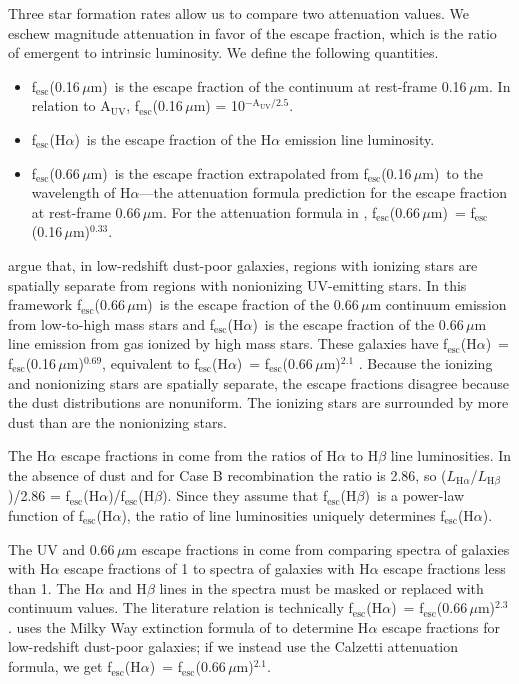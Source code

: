 \documentclass[referee]{aa}
\newcommand{\alephuv}{f$_{\mathrm{esc}}$(0.16$\,\mu$m)}
\newcommand{\alephha}{f$_{\mathrm{esc}}$(H$\alpha$)}
\newcommand{\alephuvha}{f$_{\mathrm{esc}}$(0.66$\,\mu$m)}
\newcommand{\alephhb}{f$_{\mathrm{esc}}$(H$\beta$)}
\begin{document}
Three star formation rates allow us to compare two attenuation values.
We eschew magnitude attenuation in favor of the escape fraction, which
is the ratio of emergent to intrinsic luminosity.  We define the following
quantities.
\begin{itemize}
\item \alephuv~is the escape fraction of the continuum
at rest-frame 0.16$\,\mu$m.  In
relation to A$_{\mathrm{UV}}$,
f$_{\mathrm{esc}}$(0.16$\,\mu$m) = 10$^{-\mathrm{A}_{\mathrm{UV}}/2.5}$.
\item \alephha~is the escape fraction of the H$\alpha$ emission line luminosity.
\item \alephuvha~is the escape fraction extrapolated from \alephuv~to the
wavelength of H$\alpha$---the attenuation formula prediction for the escape
fraction at rest-frame 0.66$\,\mu$m.  For the
attenuation formula in \citet{calzetti00}, \alephuvha~= \alephuv$^{0.33}$.
\end{itemize}

\citet{calzetti94} argue that, in low-redshift dust-poor galaxies, regions with
ionizing stars are spatially separate from regions with nonionizing
UV-emitting stars.  In this framework \alephuvha~is the escape fraction
of the 0.66$\,\mu$m continuum emission from low-to-high mass stars and
\alephha~is the escape fraction of the 0.66$\,\mu$m line emission from gas
ionized by high mass stars.  These galaxies have \alephha~= \alephuv$^{0.69}$,
equivalent to \alephha~= \alephuvha$^{2.1}$ \citep{calzetti94,calzetti97b}.
Because the ionizing and nonionizing stars are spatially separate, the
escape fractions disagree because the dust distributions are nonuniform.  The
ionizing stars are surrounded by more dust than are the nonionizing stars.

The H$\alpha$ escape fractions in \citet{calzetti94} come from the ratios of
H$\alpha$ to H$\beta$
line luminosities.  In the absence of dust and for Case B recombination
the ratio is 2.86, so
($L_{\mathrm{H}\alpha}$/$L_{\mathrm{H}\beta}$)/2.86 = \alephha/\alephhb.  Since
they assume that \alephhb~is a power-law function of \alephha, the ratio of line
luminosities uniquely determines \alephha.

The UV and 0.66$\,\mu$m escape fractions in \citet{calzetti94} come from
comparing spectra of
galaxies with H$\alpha$ escape fractions of 1 to spectra of galaxies with
H$\alpha$ escape fractions less than 1.  The H$\alpha$ and H$\beta$ lines in
the spectra must be masked or replaced with continuum values.  The literature
relation is technically
\alephha~= \alephuvha$^{2.3}$.  \citet{calzetti97b} uses the Milky Way
extinction formula of \citet{howarth83} to determine H$\alpha$ escape
fractions for low-redshift dust-poor galaxies; if we instead use the
Calzetti attenuation formula, we get \alephha~= \alephuvha$^{2.1}$.
\end{document}
